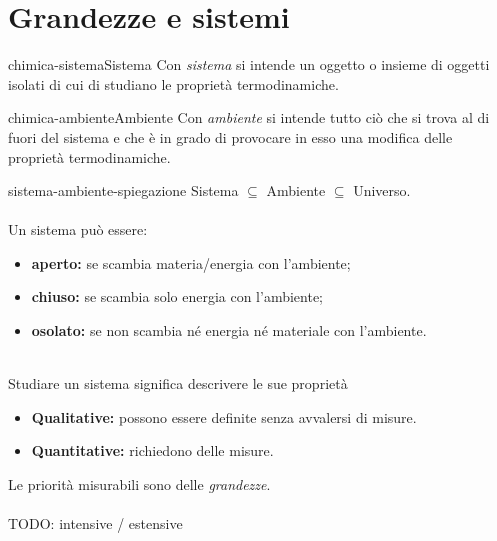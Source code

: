 \documentclass[preview]{standalone}
\begin{document}
\genpage

\section{Grandezze e sistemi}

\begin{snippetdefinition}{chimica-sistema}{Sistema}
    Con \textit{sistema}
    si intende un oggetto o insieme di oggetti isolati
    di cui di studiano le proprietà termodinamiche.
\end{snippetdefinition}

\begin{snippetdefinition}{chimica-ambiente}{Ambiente}
    Con \textit{ambiente} si intende tutto ciò che si
    trova al di fuori del sistema e che è in grado
    di provocare in esso una modifica delle proprietà
    termodinamiche.
\end{snippetdefinition}

\begin{snippet}{sistema-ambiente-spiegazione}
Sistema \(\subseteq\) Ambiente \(\subseteq\) Universo.
\\\\
Un sistema può essere:
\begin{itemize}
    \item \textbf{aperto:} se scambia materia/energia con l'ambiente;
    \item \textbf{chiuso:} se scambia solo energia con l'ambiente;
    \item \textbf{osolato:} se non scambia né energia né materiale con l'ambiente.
\end{itemize}
\phantom{}\\
Studiare un sistema significa descrivere le sue proprietà
\begin{itemize}
    \item \textbf{Qualitative:} possono essere definite senza avvalersi
    di misure.
    \item \textbf{Quantitative:} richiedono delle misure.
\end{itemize}
Le priorità misurabili sono delle \textit{grandezze}.
\\\\
TODO: intensive / estensive
\end{snippet}
\end{document}
